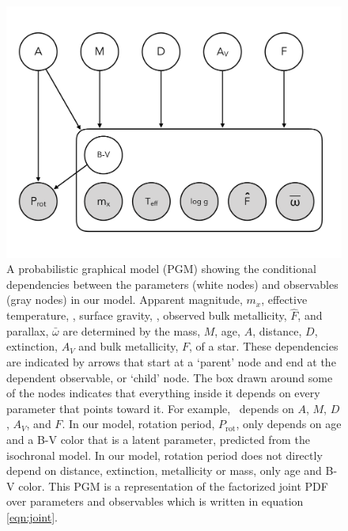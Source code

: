 \begin{figure}
  \caption{
A probabilistic graphical model (PGM) showing the conditional
dependencies between the parameters (white nodes) and
observables (gray nodes) in our model.
Apparent magnitude, $m_x$, effective temperature, \teff, surface gravity,
\logg, observed bulk metallicity, $\hat{F}$, and parallax, $\bar{\omega}$ are
determined by the mass, $M$, age, $A$, distance, $D$, extinction, $A_V$
and bulk metallicity, $F$, of a star.
These dependencies are indicated by arrows that start at a `parent' node
and end at the dependent observable, or `child' node.
The box drawn around some of the nodes indicates that everything inside it
depends on every parameter that points toward it.
For example, \logg\ depends on $A$, $M$, $D$, $A_V$, and $F$.
In our model, rotation period, $P_{\mathrm{rot}}$, only depends on age and a
B-V color that is a latent parameter, predicted from the isochronal model.
In our model, rotation period does not directly depend on distance,
extinction, metallicity or mass, only age and B-V color.
This PGM is a representation of the factorized joint PDF over parameters and
observables which is written in equation \ref{eqn:joint}.
}
  \centering
    \includegraphics[width=.7\textwidth]{PGM}
\end{figure}
\label{fig:PGM}

